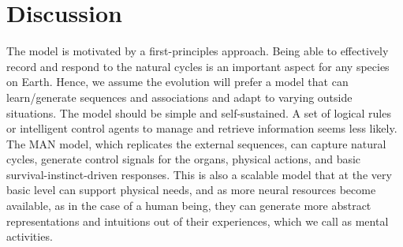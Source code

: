 \documentclass[reprint,amsmath,amssymb,apr,aip,onecolumn, 11pt]{revtex4-1}
\begin{document}


	

	
	
	\section{Discussion}
	
The model is motivated by a first-principles approach. Being able to effectively record and respond to the natural cycles is an important aspect for any species on Earth. Hence, we assume the evolution will prefer a model that can learn/generate sequences and associations and adapt to varying outside situations. The model should be simple and self-sustained. A set of logical rules or intelligent control agents to manage and retrieve information seems less likely. The MAN model, which replicates the external sequences, can capture natural cycles, generate control signals for the organs, physical actions, and basic survival-instinct-driven responses. This is also a scalable model that at the very basic level can support physical needs, and as more neural resources become available, as in the case of a human being, they can generate more abstract representations and intuitions out of their experiences, which we call as mental activities. 
\end{document}
